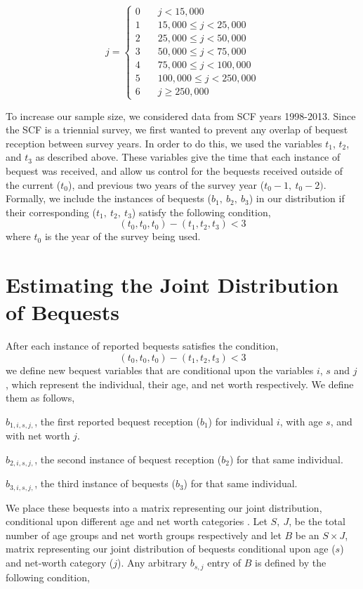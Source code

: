 \documentclass[letterpaper,12pt]{article}
\theoremstyle{definition}
\begin{document}
\begin{spacing}{1.5}
  \[ j = \left\{
        \begin{array}{ll}
            0 & \quad j < 15,000 \\
            1 & \quad 15,000 \leq j <25,000 \\
            2& \quad 25,000 \leq j <50,000 \\
            3 & \quad 50,000 \leq j <75,000\\
            4 & \quad 75,000 \leq j <100,000 \\
            5 & \quad 100,000 \leq j <250,000\\
            6 & \quad j \geq 250,000 
        \end{array}
    \right. \]


  To increase our sample size, we considered data from SCF years 1998-2013. Since the SCF is a triennial survey, we first wanted to prevent any overlap of bequest reception between survey years. In order to do this, we used the variables $t_1$, $t_2$, and $t_3$  as described above. These variables give the time that each instance of bequest was received, and allow us control for the bequests received outside of the current ($t_0$), and previous two years of the survey year ($t_0 -1,~t_0 - 2)$. Formally, we include the instances of bequests ($b_1, ~ b_2,~b_3$) in our distribution if their corresponding ($t_1,~ t_2,~t_3$) satisfy the following condition,
  \[(t_0,t_0,t_0) - (t_1, t_2,t_3)<3\]
  where $t_0$ is the year of the survey being used.

\section{Estimating the Joint Distribution of Bequests}\label{SecDist}

  After each instance of reported bequests satisfies the condition,
  \[(t_0,t_0,t_0) - (t_1, t_2,t_3)<3\]
  we define new bequest variables that are conditional upon the variables $i$, $s$ and $j$, which represent the individual, their age, and net worth respectively. We define them as follows,
  
  $b_{1,i,s,j,}$, the first reported bequest reception ($b_1$) for individual $i$, with age $s$, and with net worth $j$.
  
  $b_{2,i,s,j,}$, the second instance of bequest reception ($b_2$) for that same individual.
  
  $b_{3,i,s,j,}$, the third instance of bequests ($b_3$) for that same individual.
  
   We place these bequests into a matrix representing our joint distribution, conditional upon different age and net worth categories . Let $S, ~J$, be the total number of age groups and net worth groups respectively and let $B$ be an $S \times J$, matrix representing our joint distribution of bequests conditional upon age ($s$) and net-worth category ($j$). Any arbitrary $b_{s,j}$ entry of $B$ is defined by the following condition,


\end{spacing}
\end{document}
